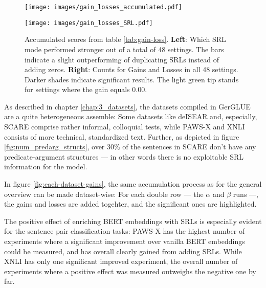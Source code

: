 \begin{figure}
  \begin{minipage}{0.45\linewidth}
  \vspace{0pt}
    \texttt{[image: images/gain\_losses\_accumulated.pdf]}
  \end{minipage}
  \hfill
  \begin{minipage}{0.45\linewidth}
  \vspace{0pt}
    \texttt{[image: images/gain\_losses\_SRL.pdf]}
  \end{minipage}
  \caption[Accumulated Gains and Losses.]{Accumulated scores from table \ref{tab:gain-loss}. \textbf{Left}: Which SRL mode performed stronger out of a total of 48 settings. The bars indicate a slight outperforming of duplicating SRLs instead of adding zeros. \textbf{Right}: Counts for Gains and Losses in all 48 settings. Darker shades indicate significant results. The light green tip stands for settings where the gain equals 0.00.}
  \label{fig:classification-gains}
\end{figure}

As described in chapter \ref{chap:3_datasets}, the datasets compiled in GerGLUE are a quite
heterogeneous assemble: Some datasets like deISEAR and, especially, SCARE comprise rather
informal, colloquial tests, while PAWS-X and XNLI consists of more technical, standardized text.
Further, as depicted in figure \ref{fig:num_predarg_structs}, over 30\% of the sentences
in SCARE don't have any predicate-argument structures --- in other words there is no exploitable SRL
information for the model.

In figure \ref{fig:each-dataset-gains}, the same accumulation process as for the general overview
can be made dataset-wise: For each double row --- the $\alpha$ and $\beta$ runs ---, the gains and
losses are added togehter, and the significant ones are highlighted.

The positive effect of enriching BERT embeddings with SRLs is especially evident for
the sentence pair classification tasks: PAWS-X has the highest number of experiments where a significant
improvement over vanilla BERT embeddings could be measured, and has overall clearly gained from adding
SRLs. While XNLI has only one significant improved experiment, the overall number of experiments
where a positive effect was measured outweighs the negative one by far.


